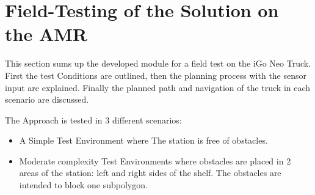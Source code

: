 \begin{table}[H]
    \centering
    \caption{Comparison of Fitness Values of the optimum paths generated by Different Algorithms in Simple and Complex Environments}
    \label{tab:fitness_values}    
\end{table}

\section{Field-Testing of the Solution on the AMR}
This section sums up the developed module for a field test on the iGo Neo Truck. 
First the test Conditions are outlined, then the planning process with the sensor input are explained.
Finally the planned path and navigation of the truck in each scenario are discussed.

The Approach is tested in 3 different scenarios:
\begin{itemize}
    \item A Simple Test Environment where The station is free of obstacles.
    \item Moderate complexity Test Environments where  obstacles are placed in 2 areas of the station:
    left and right sides of the shelf. The obstacles are intended to block one subpolygon.
\end{itemize}

